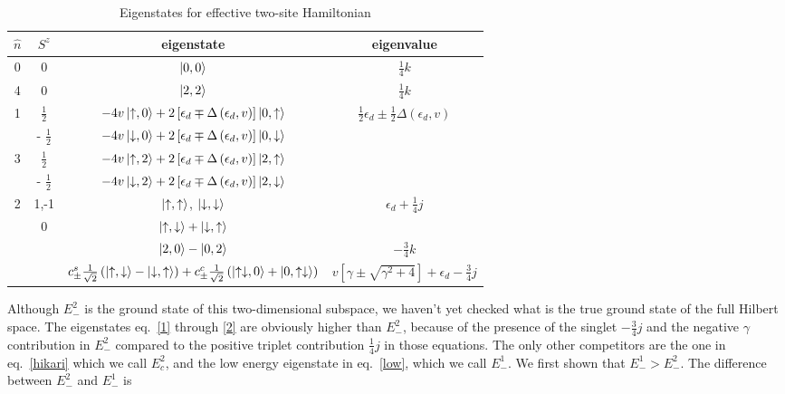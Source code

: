\documentclass[12pt,twoside]{report}
\numberwithin{equation}{section}
\begin{document}
\begin{table}[htpb!]
	\centering
	\begin{tabular}{|c|c|c|c|}
		\hline
		\(\hat n\) & \(S^z\) & eigenstate & eigenvalue\\
		\hline
		0 & 0 & \(\ket{0,0}\) & \(\frac{1}{4}k\)\\
		4 & 0 & \(\ket{2,2}\) & \(\frac{1}{4}k\)\\
		\multirow{2}{*}{1} & \(\frac{1}{2}\) & \(-4v\ket{\uparrow,0} +2 \left[ \epsilon_d \mp \Delta\left(\epsilon_d , v\right)\right] \ket{0, \uparrow}\) & \multirow{4}{*}{\(\frac{1}{2} \epsilon_d \pm \frac{1}{2}\Delta\left(\epsilon_d , v\right)\)}\\
		 & - \(\frac{1}{2}\) & \(-4v\ket{\downarrow,0} +2 \left[ \epsilon_d \mp \Delta\left(\epsilon_d , v\right)\right] \ket{0, \downarrow}\)  &\\
		\multirow{2}{*}{3} & \(\frac{1}{2}\) & \(-4v\ket{\uparrow,2} +2 \left[ \epsilon_d \mp \Delta\left(\epsilon_d , v\right)\right] \ket{2, \uparrow}\) &\\
		 & - \(\frac{1}{2}\) & \(-4v\ket{\downarrow,2} +2 \left[ \epsilon_d \mp \Delta\left(\epsilon_d , v\right)\right] \ket{2, \downarrow}\)  &\\
		\multirow{5}{*}{2} & 1,-1 & \(\ket{\uparrow,\uparrow}\), \(\ket{\downarrow,\downarrow}\) & \multirow{2}{*}{\(\epsilon_d + \frac{1}{4}j\)}\\
		& \multirow{3}{*}{0} & \(\ket{\uparrow,\downarrow} + \ket{\downarrow, \uparrow}\) & \\
		& & \(\ket{2,0} - \ket{0,2}\) & \(-\frac{3}{4}k\)\\
		& & \(c_\pm^s \frac{1}{\sqrt 2}\left(\ket{\uparrow, \downarrow} - \ket{\downarrow, \uparrow}\right) + c^c_\pm \frac{1}{\sqrt 2}\left(\ket{\uparrow\downarrow, 0} + \ket{0, \uparrow\downarrow}\right)\) & \(v\left[ \gamma \pm \sqrt{\gamma^2 + 4} \right] + \epsilon_d - \frac{3}{4}j\)\\
		\hline
	\end{tabular}
	\caption{Eigenstates for effective two-site Hamiltonian}
	\label{tab:label}
\end{table}
\pb Although \(E^2_-\) is the ground state of this two-dimensional subspace, we haven't yet checked what is the true ground state of the full Hilbert space. The eigenstates eq.~\ref{1} through \ref{2} are obviously higher than \(E_-^2\), because of the presence of the singlet \(- \frac{3}{4}j\) and the negative \(\gamma\) contribution in \(E_-^2\) compared to the positive triplet contribution \( \frac{1}{4}j\) in those equations. The only other competitors are the one in eq.~\ref{hikari} which we call \(E_c^2\), and the low energy eigenstate in eq.~\ref{low}, which we call \(E_-^1\). We first shown that \(E_-^1 > E_-^2\). The difference between \(E_-^2\) and \(E_-^1\) is
\end{document}

